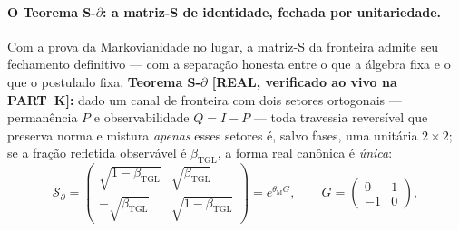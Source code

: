 \documentclass[12pt,a4paper]{article}
\newcommand{\betatgl}{\beta_{\text{TGL}}}
\newcommand{\thetaM}{\theta_{\text{M}}}
\begin{document}
\paragraph{O Teorema S-$\partial$: a matriz-S de identidade, fechada por unitariedade.}  Com a prova da Markovianidade no lugar, a matriz-S da fronteira admite seu fechamento definitivo --- com a separação honesta entre o que a álgebra fixa e o que o postulado fixa.  \textbf{Teorema S-$\partial$ [REAL, verificado ao vivo na PART~K]:} dado um canal de fronteira com dois setores ortogonais --- permanência $P$ e observabilidade $Q=I-P$ --- toda travessia reversível que preserva norma e mistura \emph{apenas} esses setores é, salvo fases, uma unitária $2\times2$; se a fração refletida observável é $\betatgl$, a forma real canônica é \emph{única}:
\begin{equation}
\mathcal S_\partial = \begin{pmatrix} \sqrt{1-\betatgl} & \sqrt{\betatgl} \\ -\sqrt{\betatgl} & \sqrt{1-\betatgl} \end{pmatrix} = e^{\thetaM G}, \qquad G = \begin{pmatrix} 0 & 1 \\ -1 & 0 \end{pmatrix},
\end{equation}
\end{document}
